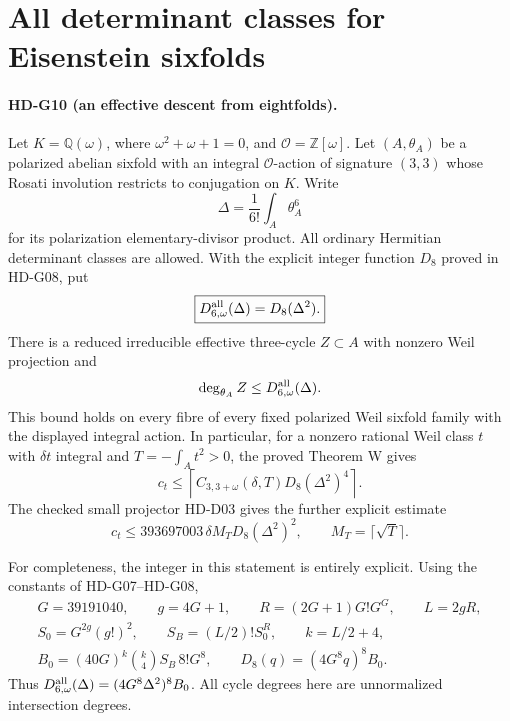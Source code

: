 
\section{All determinant classes for Eisenstein sixfolds}

\paragraph{HD-G10 (an effective descent from eightfolds).}
Let $K=\mathbb Q(\omega)$, where $\omega^2+\omega+1=0$, and
$\mathcal O=\mathbb Z[\omega]$. Let $(A,\theta_A)$ be a polarized
abelian sixfold with an integral $\mathcal O$-action of signature $(3,3)$
whose Rosati involution restricts to conjugation on $K$. Write
\[
\Delta=\frac1{6!}\int_A\theta_A^6
\]
for its polarization elementary-divisor product. All ordinary Hermitian
determinant classes are allowed. With the explicit integer function
$D_8$ proved in HD-G08, put
\[
\boxed{D_{6,\omega}^{\rm all}(\Delta)=D_8(\Delta^2).}
\]
There is a reduced irreducible effective three-cycle $Z\subset A$ with
nonzero Weil projection and
\[
\deg_{\theta_A}Z\le D_{6,\omega}^{\rm all}(\Delta).
\]
This bound holds on every fibre of every fixed polarized Weil sixfold
family with the displayed integral action. In particular, for a nonzero
rational Weil class $t$ with $\delta t$ integral and
$T=-\int_A t^2>0$, the proved Theorem W gives
\[
\boxed{
c_t\le\left\lceil
C_{3,3+\omega}(\delta,T)D_8(\Delta^2)^4
\right\rceil.}
\]
The checked small projector HD-D03 gives the further explicit estimate
\[
\boxed{c_t\le393697003\,\delta M_T D_8(\Delta^2)^2,
\qquad M_T=\lceil\sqrt T\rceil.}
\]

For completeness, the integer in this statement is entirely explicit.
Using the constants of HD-G07--HD-G08,
\[
\begin{gathered}
G=39191040,\qquad g=4G+1,\qquad
R=(2G+1)G!G^G,\qquad L=2gR,\\
S_0=G^{2g}(g!)^2,\qquad
S_B=(L/2)!S_0^R,\qquad k=L/2+4,\\
B_0=(40G)^k\binom{k}{4}S_B\,8!G^8,
\qquad D_8(q)=(4G^8q)^8B_0.
\end{gathered}
\]
Thus $D_{6,\omega}^{\rm all}(\Delta)=(4G^8\Delta^2)^8B_0$.
All cycle degrees here are unnormalized intersection degrees.

